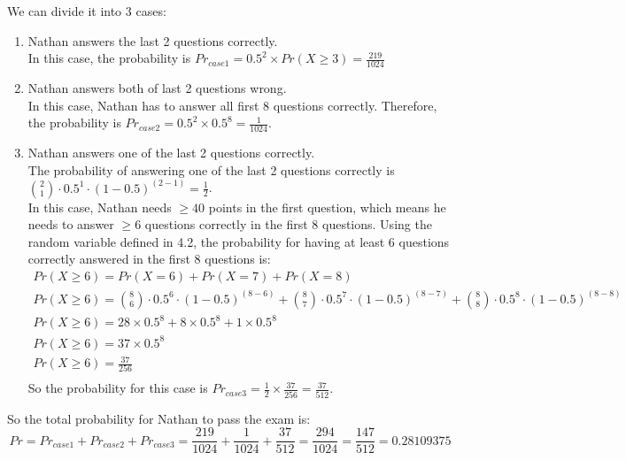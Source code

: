 \documentclass{article}
\begin{document}
We can divide it into 3 cases:
\begin{enumerate}
\item Nathan answers the last 2 questions correctly.\\
In this case, the probability is \( Pr_{case1} = 0.5^2 \times Pr(X \geq 3) = \frac{219}{1024} \)
\item Nathan answers both of last 2 questions wrong.\\
In this case, Nathan has to answer all first 8 questions correctly. Therefore, the probability is \( Pr_{case2} = 0.5^2 \times 0.5^8 = \frac{1}{1024}\).
\item Nathan answers one of the last 2 questions correctly.\\
The probability of answering one of the last 2 questions correctly is \( {2 \choose 1} \cdot 0.5^1 \cdot (1-0.5)^{(2-1)}= \frac{1}{2} \). \\
In this case, Nathan needs \( \geq 40 \) points in the first question, which means he needs to answer \( \geq 6 \) questions correctly in the first 8 questions. Using the random variable defined in 4.2, the probability for having at least 6 questions correctly answered in the first 8 questions is:
\[
\begin{array}{ll}
Pr(X \geq 6) = Pr(X = 6) + Pr(X = 7) + Pr(X = 8) \\
Pr(X \geq 6) = {8 \choose 6} \cdot 0.5^6 \cdot (1-0.5)^{(8-6)} + {8 \choose 7} \cdot 0.5^7 \cdot (1-0.5)^{(8-7)} + {8 \choose 8} \cdot 0.5^8 \cdot (1-0.5)^{(8-8)} \\
Pr(X \geq 6) = 28 \times 0.5^8 + 8 \times 0.5^8 +  1 \times 0.5^8 \\
Pr(X \geq 6) = 37 \times 0.5^8 \\
Pr(X \geq 6) = \frac{37}{256} \\
\end{array}
\]
So the probability for this case is \( Pr_{case3} = \frac{1}{2} \times \frac{37}{256} = \frac{37}{512} \).
\end{enumerate}


So the total probability for Nathan to pass the exam is:
\[
Pr = Pr_{case1} + Pr_{case2} + Pr_{case3} = \frac{219}{1024} + \frac{1}{1024} + \frac{37}{512} = \frac{294}{1024} = \frac{147}{512} = 0.28109375
\]
\end{document}
